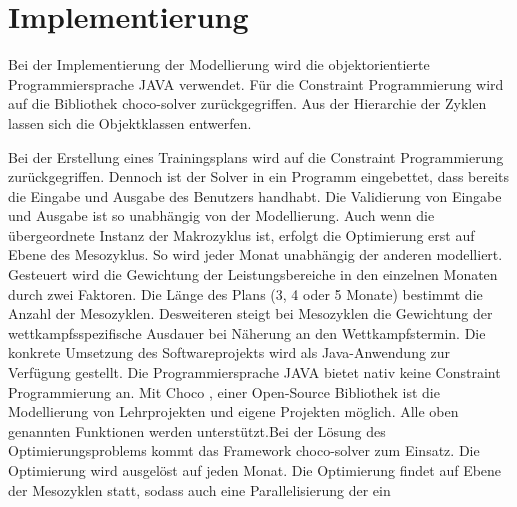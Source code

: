 \chapter{Implementierung}
\label{sec:implementierung} 
Bei der Implementierung der Modellierung wird die objektorientierte Programmiersprache JAVA \cite{java} verwendet. Für die Constraint Programmierung wird auf die Bibliothek choco-solver \cite{ChocoSolverWeb} zurückgegriffen. Aus der Hierarchie der Zyklen lassen sich die Objektklassen entwerfen. 

Bei der Erstellung eines Trainingsplans wird auf die Constraint Programmierung zurückgegriffen. Dennoch ist der Solver in ein Programm eingebettet, dass bereits die Eingabe und Ausgabe des Benutzers handhabt. Die Validierung von Eingabe und Ausgabe ist so unabhängig von der Modellierung. Auch wenn die übergeordnete Instanz der Makrozyklus ist, erfolgt die Optimierung erst auf Ebene des Mesozyklus. So wird jeder Monat unabhängig der anderen modelliert. Gesteuert wird die Gewichtung der Leistungsbereiche in den einzelnen Monaten durch zwei Faktoren. Die Länge des Plans (3, 4 oder 5 Monate) bestimmt die Anzahl der Mesozyklen. Desweiteren steigt bei Mesozyklen die Gewichtung der wettkampfsspezifische Ausdauer bei Näherung an den Wettkampfstermin.
Die konkrete Umsetzung des Softwareprojekts wird als Java-Anwendung zur Verfügung gestellt. 
Die Programmiersprache JAVA\cite{java} bietet nativ keine Constraint Programmierung an. Mit Choco \cite{ChocoSolverWeb}, einer Open-Source Bibliothek ist die Modellierung von Lehrprojekten und eigene Projekten möglich. Alle oben genannten Funktionen werden unterstützt.Bei der Lösung des Optimierungsproblems kommt das Framework choco-solver zum Einsatz. Die Optimierung wird ausgelöst auf jeden Monat.
Die Optimierung findet auf Ebene der Mesozyklen statt, sodass auch eine Parallelisierung der ein
